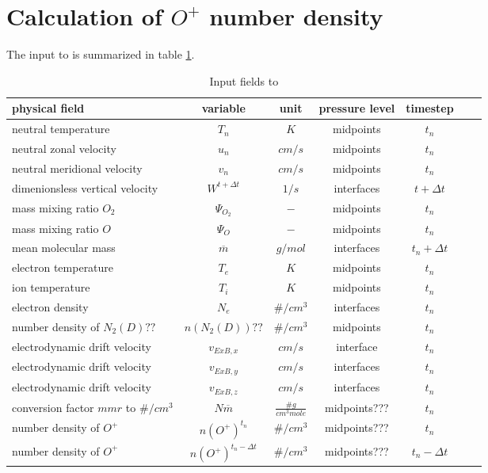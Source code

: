 %
\section{Calculation of $O^+$ number density  
  }\label{cap:oplus}
%
The input to  is summarized in table
\ref{tab:input_oplus}.
%
\begin{table}[tb]
\begin{tabular}{|p{3.5cm} ||c|c|c|c|c|c|} \hline
physical field               & variable        & unit&pressure
level& timestep
\\ \hline \hline
%
neutral temperature &       $T_n$              & $K$   &  midpoints & $t_n$\\
neutral zonal velocity&     $u_n$     & $cm/s$   &  midpoints & $t_n$\\
neutral meridional velocity & $v_n$   & $cm/s$   &  midpoints & $t_n$\\
dimenionsless vertical velocity& $W^{t+\Delta t}$& $1/s$   & interfaces& $t+\Delta t$ \\
mass mixing ratio $O_2$&       {$\Psi_{O_2}$}     & $-$   & midpoints  & $t_n$\\
mass mixing ratio $O$&       {$\Psi_{O}$}     & $-$   &  midpoints & $t_n$\\
mean molecular mass&       {$\overline{m}$}     & $g/mol$   & interfaces  &$t_n + \Delta t$ \\
electron temperature &       $T_e$              & $K$   &  midpoints & $t_n$\\
ion temperature &       $T_i$              & $K$   &  midpoints & $t_n$\\
electron density &       $N_e$              & $\#/cm^3$   &  interfaces & $t_n$\\
number density of $N_2(D)??$ &       $n(N_2(D))??$              & $\#/cm^3$   &  midpoints & $t_n$\\
electrodynamic drift velocity &       $v_{ExB,x}$              & $cm/s$   &  interface & $t_n$\\
electrodynamic drift velocity &       $v_{ExB,y}$              & $cm/s$   &  interfaces & $t_n$\\
electrodynamic drift velocity &       $v_{ExB,z}$              & $cm/s$   &  interfaces & $t_n$\\
conversion factor $mmr$ to $\#/cm^3$ &       $N\overline{m}$              & $\frac{\# g}{cm^3 mole}$   &  midpoints??? & $t_n$\\
number density of $O^+$ &       $n(O^+)^{t_n}$              & $\#/cm^3$   &  midpoints??? & $t_n$\\
number density of $O^+$ &       $n(O^+)^{t_n- \Delta t}$ & $\#/cm^3$
&  midpoints??? & $t_n- \Delta t$
  \\ \hline
\end{tabular}
\caption{Input fields to }
\label{tab:input_oplus}
\end{table}
